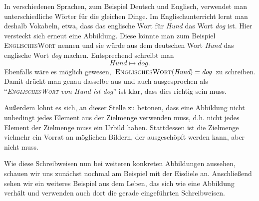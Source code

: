 \documentclass[../../main.tex]{subfiles}
\begin{document}
\begin{example}{}
    In verschiedenen Sprachen, zum Beispiel Deutsch und Englisch, verwendet man unterschiedliche Wörter für die gleichen Dinge. Im Englischunterricht lernt man deshalb Vokabeln, etwa, dass das englische Wort für \emph{Hund} das Wort \emph{dog} ist. Hier versteckt sich erneut eine Abbildung. Diese könnte man zum Beispiel \textsc{EnglischesWort} nennen und sie würde aus dem deutschen Wort \emph{Hund} das englische Wort \emph{dog} machen. Entsprechend schreibt man
    \[\textit{Hund}\mapsto\textit{dog}.\]
    Ebenfalls wäre es möglich gewesen, $\textsc{EnglischesWort}(\textit{Hund})=\textit{dog}$ zu schreiben. Damit drückt man genau dasselbe aus und auch ausgesprochen als \enquote{\emph{\textsc{EnglischesWort} von Hund ist dog}} ist klar, dass dies richtig sein muss.
\end{example}

Außerdem lohnt es sich, an dieser Stelle zu betonen, dass eine Abbildung nicht unbedingt jedes Element aus der Zielmenge verwenden muss, d.h. nicht jedes Element der Zielmenge muss ein Urbild haben. Stattdessen ist die Zielmenge vielmehr ein Vorrat an möglichen Bildern, der ausgeschöpft werden kann, aber nicht muss.

Wie diese Schreibweisen nun bei weiteren konkreten Abbildungen aussehen, schauen wir uns zunächst nochmal am Beispiel mit der Eisdiele an. Anschließend sehen wir ein weiteres Beispiel aus dem Leben, das sich wie eine Abbildung verhält und verwenden auch dort die gerade eingeführten Schreibweisen.
\end{document}
